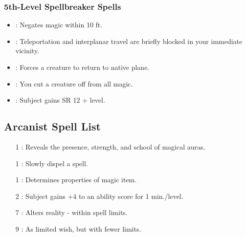 \subsubsection{5th-Level Spellbreaker Spells}
\begin{itemize}
  \item {}: Negates magic within 10 ft.
  \item {}: Teleportation and interplanar travel are briefly blocked in your immediate vicinity.
  \item {}: Forces a creature to return to native plane.
  \item {}: You cut a creature off from all magic.
  \item {}: Subject gains SR 12 + level.
\end{itemize}

\subsection{Arcanist Spell List}
\begin{itemize}
  \item[1] : Reveals the presence, strength, and school of magical auras.
  \item[1] : Slowly dispel a spell.
  \item[1] : Determines properties of magic item.
  \item[2] : Subject gains +4 to an ability score for 1 min./level.
  \item[7] : Alters reality - within spell limits.
  \item[9] : As limited wish, but with fewer limits.
\end{itemize}



